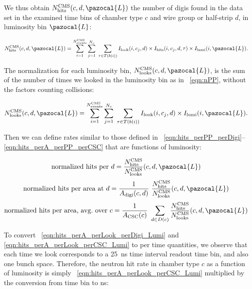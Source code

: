 We thus obtain $N_\text{hits}^\text{CMS}(c, d, \pazocal{L})$
the number of digis found in the data set in the examined time bins of
chamber type $c$ and wire group or half-strip $d$, in luminosity bin $\pazocal{L}$:

\begin{equation}
 	\label{eqn:nHits_Lumi}
        N_\text{hits}^\text{CMS}(c, d, \pazocal{L}) = 
        \sum_{i=1}^{N^\text{CMS}_\text{events}}
        \sum_{j=1}^{N_c} \ 
        \sum_{\tau\in T(b(i))}
        I_\text{look}(i, c_j, d) \times
        I_\text{hits}(i, c_j, d, \tau) \times
        I_\text{lumi}(i, \pazocal{L}). 
\end{equation}

The normalization for each luminosity bin, $N^\text{CMS}_\text{looks}(c,
d, \pazocal{L})$, is the sum of the number of times we looked in the
luminosity bin as in \Eq~\ref{eqn:nPP}, without the factors counting \pp
collisions:

\begin{equation}
 	\label{eqn:nLooks_Lumi}        
        N^\text{CMS}_\text{looks}(c, d, \pazocal{L}) = 
        \sum_{i=1}^{N^\text{CMS}_\text{events}}
        \sum_{j=1}^{N_c} \ 
        \sum_{\tau\in T(b(i))}
        I_\text{look}(i, c_j, d) \times
        I_\text{lumi}(i, \pazocal{L}).
\end{equation}

Then we can define rates similar to those defined in \Eqs~\ref{eqn:hits_perPP_perDigi}--\ref{eqn:hits_perA_perPP_perCSC} that are functions of luminosity:

\begin{equation}
	\label{eqn:hits_perLook_perDigi_Lumi}
\text{normalized hits per $d$} = 
   \frac{{N}^\text{CMS}_\text{hits}}{N^\text{CMS}_{\text{looks}}}(c, d, \pazocal{L})
\end{equation}
\begin{equation}
    \label{eqn:hits_perA_perLook_perDigi_Lumi}
\text{normalized hits per area at $d$} = 
  \frac{1}{A_\text{digi}(c, d)}  \  \frac{{N}^\text{CMS}_\text{hits}}{N^\text{CMS}_{\text{looks}}}(c, d, \pazocal{L})
\end{equation}
\begin{equation}
    \label{eqn:hits_perA_perLook_perCSC_Lumi}
\text{normalized hits per area, avg.\ over $c$} = 
  \frac{1}{A_\text{CSC}(c)}  \  \sum_{d\in D(c)}{\frac{{N}^\text{CMS}_\text{hits}}{N^\text{CMS}_{\text{looks}}}(c, d, \pazocal{L})}
\end{equation}

To convert \Eqs~\ref{eqn:hits_perA_perLook_perDigi_Lumi} and \ref{eqn:hits_perA_perLook_perCSC_Lumi} to per time quantities, we observe that each time we look corresponds to a 25~ns time interval readout time bin, and also one bunch space. Therefore, the neutron hit rate in chamber type $c$ as a function of luminosity is simply \Eq~\ref{eqn:hits_perA_perLook_perCSC_Lumi} multiplied by the conversion from time bin to ns:

